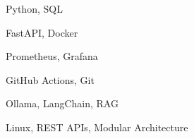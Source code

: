 
{Python, SQL}

{FastAPI, Docker}

{Prometheus, Grafana}

{GitHub Actions, Git}

{Ollama, LangChain, RAG}

{Linux, REST APIs, Modular Architecture}